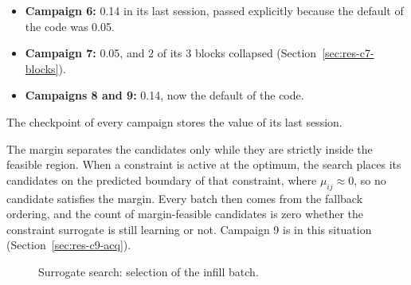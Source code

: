 \begin{itemize}
        \begin{itemize}
          \item \textbf{Campaign 6:} 0.14 in its last session, passed
                explicitly because the default of the code was 0.05.
          \item \textbf{Campaign 7:} 0.05, and 2 of its 3 blocks
                collapsed (Section~\ref{sec:res-c7-blocks}).
          \item \textbf{Campaigns 8 and 9:} 0.14, now the default of the
                code.
        \end{itemize}

        The checkpoint of every campaign stores the value of its last
        session.
\end{itemize}

The margin separates the candidates only while they are strictly
inside the feasible region. When a constraint is active at the optimum,
the search places its candidates on the predicted boundary of that
constraint, where $\mu_{ij} \approx 0$, so no candidate satisfies the
margin. Every batch then comes from the fallback ordering, and the count
of margin-feasible candidates is zero whether the constraint surrogate
is still learning or not. Campaign 9 is in this situation
(Section~\ref{sec:res-c9-acq}).

\begin{figure}[htbp]
  \centering
  \caption{Surrogate search: selection of the infill batch.}
  \label{fig:meth-acq-flow}
\end{figure}

